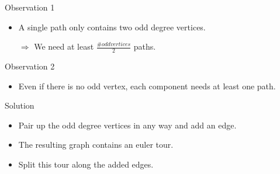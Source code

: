 \begin{frame}[c]
	\frametitle{\problemtitle}
	\begin{block}{Observation 1}
		\begin{itemize}
			\item A single path only contains two odd degree vertices.
			\item[$\Rightarrow$] We need at least $\frac{\#\mathit{odd vertices}}{2}$ paths.
		\end{itemize}
	\end{block}
	\pause
	\begin{block}{Observation 2}
		\begin{itemize}
			\item Even if there is no odd vertex, each component needs at least one path.
		\end{itemize}
	\end{block}
	\pause
	\begin{block}{Solution}
		\begin{itemize}
			\item Pair up the odd degree vertices in any way and add an edge.
			\item The resulting graph contains an euler tour.
			\item Split this tour along the added edges.
		\end{itemize}
	\end{block}
	\solvestats
\end{frame}